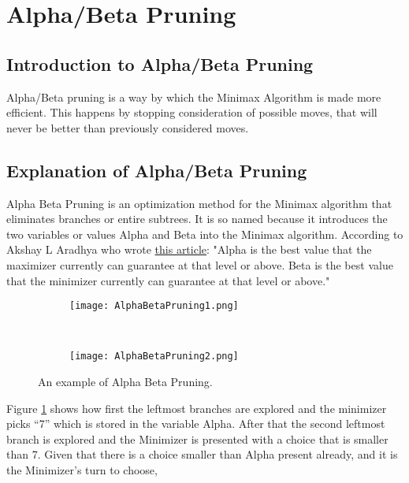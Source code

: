 \section{Alpha/Beta Pruning} 
\label{sec:Alpha/Beta Pruning}

\subsection{Introduction to Alpha/Beta Pruning}
\label{subsec:Introduction to Alpha/Beta Pruning}
Alpha/Beta pruning is a way by which the Minimax Algorithm is made more efficient.
This happens by stopping consideration of possible moves, that will never be better than previously considered moves.

\subsection{Explanation of Alpha/Beta Pruning}
\label{subsec:Explanation of Alpha/Beta Pruning}
Alpha Beta Pruning is an optimization method for the Minimax algorithm that eliminates branches or entire subtrees. 
It is so named because it introduces the two variables or values Alpha and Beta into the Minimax algorithm.
According to Akshay L Aradhya who wrote \href{https://www.geeksforgeeks.org/minimax-algorithm-in-game-theory-set-4-alpha-beta-pruning/}{this article}:
"Alpha is the best value that the maximizer currently can guarantee at that level or above.
Beta is the best value that the minimizer currently can guarantee at that level or above."
\begin{figure}
    \centering %
    \begin{subfigure}[b]{0.3\textwidth}
        \texttt{[image: AlphaBetaPruning1.png]}           
    \end{subfigure}
    ~
    \begin{subfigure}[b]{0.3\textwidth}
        \texttt{[image: AlphaBetaPruning2.png]}       
    \end{subfigure}
    \caption{An example of Alpha Beta Pruning.} %
    \label{fig:AlphaBetaPruningA}
  \end{figure}
Figure \ref{fig:AlphaBetaPruningA}  shows how first the leftmost branches are explored 
and the minimizer picks “7” which is stored in the variable Alpha. 
After that the second leftmost branch is explored and the Minimizer is presented with a choice that is smaller than 7.
Given that there is a choice smaller than Alpha present already, and it is the Minimizer’s turn to choose, 
